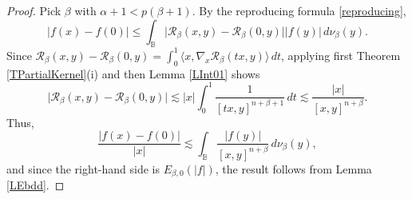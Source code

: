 \documentclass{amsart}
\theoremstyle{definition}
\theoremstyle{remark}
\begin{document}
\begin{proof}
Pick $\beta$ with $\alpha+1<p(\beta+1)$.
By the reproducing formula \eqref{reproducing},
\begin{equation*}
\vert f(x)-f(0)\vert\le \int_{\mathbb B}
\vert \mathcal R_\beta(x,y)-\mathcal R_\beta(0,y)\vert
\vert f(y)\vert\,d\nu_\beta(y).
\end{equation*}
Since $\mathcal R_\beta(x,y)-\mathcal R_\beta(0,y)
=\int_0^1\langle x,\nabla_x\mathcal R_\beta(tx,y)\rangle\, dt$,
applying first Theorem \ref{TPartialKernel}(i) and then Lemma \ref{LInt01}
shows
\begin{equation*}
\vert \mathcal R_\beta(x,y)-\mathcal R_\beta(0,y)\vert
\lesssim \vert x\vert \int_0^1\frac{1}{[tx,y]^{n+\beta+1}}\, dt
\lesssim\frac{\vert x\vert}{[x,y]^{n+\beta}}.
\end{equation*}
Thus,
\begin{equation}\label{foverxless}
\frac{\vert f(x)-f(0)\vert}{\vert x\vert}
\lesssim \int_{\mathbb B} \frac{\vert f(y)\vert}{[x,y]^{n+\beta}}\,d\nu_\beta(y),
\end{equation}
and since the right-hand side is $E_{\beta,0}(\vert f\vert)$, the result
follows from Lemma \ref{LEbdd}.
\end{proof}
\end{document}
